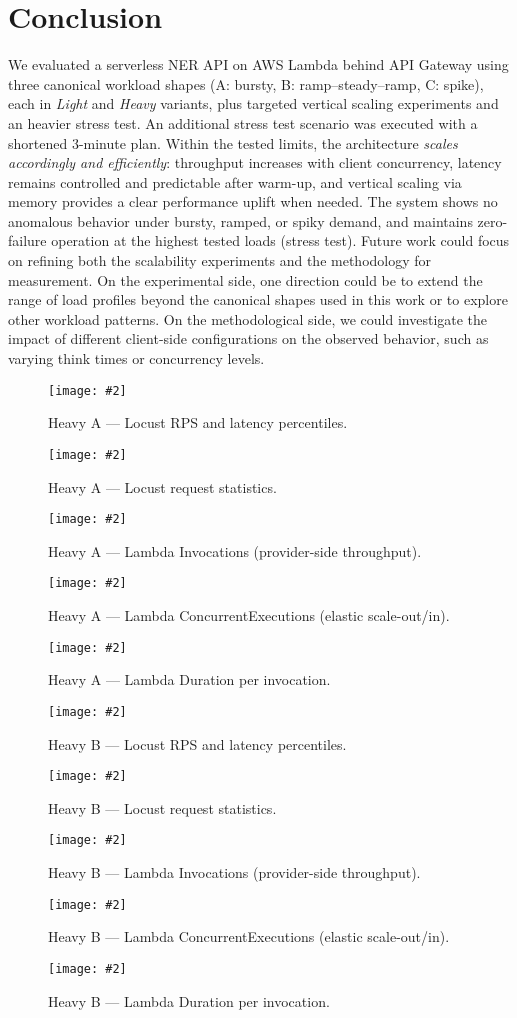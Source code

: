 \documentclass[11pt,a4paper]{article}
\makeatletter
\newcommand{\scenariofig}[4][\linewidth]{%
  \begin{figure}[htbp]
    \centering
    \texttt{[image: \#2]}
    \caption{#3}
    \label{#4}
  \end{figure}%
}
\let\orig@includegraphics\includegraphics
\renewcommand{\includegraphics}[2][]{%
  \begingroup
    \def\imgfile{#2}%
    \IfSubStr{\imgfile}{Charts}{%
      \orig@includegraphics[width=.55\linewidth]{#2}%
    }{%
      \IfSubStr{\imgfile}{Stats}{%
        \orig@includegraphics[width=.45\linewidth]{#2}%
      }{%
        \IfSubStr{\imgfile}{Duration}{%
          \orig@includegraphics[width=.70\linewidth]{#2}%
        }{%
          \IfSubStr{\imgfile}{Invocation}{%
            \orig@includegraphics[width=.70\linewidth]{#2}%
          }{%
            \IfSubStr{\imgfile}{Invocations}{%
              \orig@includegraphics[width=.70\linewidth]{#2}%
            }{%
              \IfSubStr{\imgfile}{Concurrent}{%
                \orig@includegraphics[width=.70\linewidth]{#2}%
              }{%
                \IfSubStr{\imgfile}{ConcEx}{%
                  \orig@includegraphics[width=.70\linewidth]{#2}%
                }{%
                  \orig@includegraphics[width=\linewidth]{#2}%
                }%
              }%
            }%
          }%
        }%
      }%
    }%
  \endgroup
}
\makeatother
\begin{document}
\section{Conclusion}\label{sec:conclusion}

We evaluated a serverless NER API on AWS Lambda behind API Gateway using three canonical workload shapes (A: bursty, B: ramp–steady–ramp, C: spike), each in \emph{Light} and \emph{Heavy} variants, plus targeted vertical scaling experiments and an heavier stress test. An additional stress test scenario was executed with a shortened 3-minute plan.
Within the tested limits, the architecture \emph{scales accordingly and efficiently}: throughput increases with client concurrency, latency remains controlled and predictable after warm-up, and vertical scaling via memory provides a clear performance uplift when needed. The system shows no anomalous behavior under bursty, ramped, or spiky demand, and maintains zero-failure operation at the highest tested loads (stress test).
Future work could focus on refining both the scalability experiments and the methodology for measurement. On the experimental side, one direction could be to extend the range of load profiles beyond the canonical shapes used in this work or to explore other workload patterns. On the methodological side, we could investigate the impact of different client-side configurations on the observed behavior, such as varying think times or concurrency levels.

\scenariofig{figures/hA - Charts.png}{Heavy A — Locust RPS and latency percentiles.}{fig:ha-charts}
\scenariofig{figures/hA - Stats.png}{Heavy A — Locust request statistics.}{fig:ha-stats}
\scenariofig{figures/hA - Invocations.png}{Heavy A — Lambda Invocations (provider-side throughput).}{fig:ha-invocations}
\scenariofig{figures/hA - ConcEx.png}{Heavy A — Lambda ConcurrentExecutions (elastic scale-out/in).}{fig:ha-conc}
\scenariofig{figures/hA - Durations.png}{Heavy A — Lambda Duration per invocation.}{fig:ha-duration}

\scenariofig{figures/hB - Charts.png}{Heavy B — Locust RPS and latency percentiles.}{fig:hb-charts}
\scenariofig{figures/hB - Stats.png}{Heavy B — Locust request statistics.}{fig:hb-stats}
\scenariofig{figures/hB - Invocations.png}{Heavy B — Lambda Invocations (provider-side throughput).}{fig:hb-invocations}
\scenariofig{figures/hB - ConcEx.png}{Heavy B — Lambda ConcurrentExecutions (elastic scale-out/in).}{fig:hb-conc}
\scenariofig{figures/hB - Duration.png}{Heavy B — Lambda Duration per invocation.}{fig:hb-duration}
\end{document}
